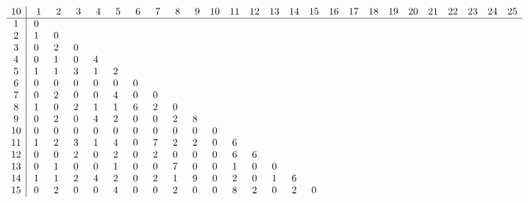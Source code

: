 \begin{landscape}
\[
\begin{array}{c|ccccccccccccccccccccccccc}\addcontentsline{lot}{table}{\protect\numberline{}Dimensions of the Kernel of $\mathcal{L}_{r,c,10}$}
10&  \phantom{0}1&  \phantom{0}2&  \phantom{0}3&  \phantom{0}4&  \phantom{0}5&  \phantom{0}6&  \phantom{0}7&  \phantom{0}8&  \phantom{0}9& 10& 11& 12& 13& 14& 15& 16& 17& 18& 19& 20& 21& 22& 23& 24& 25\\
\hline
 1&  0&   &   &   &   &   &   &   &   &   &   &   &   &   &   &   &   &   &   &   &   &   &   &   &   \\
 2&  1&  0&   &   &   &   &   &   &   &   &   &   &   &   &   &   &   &   &   &   &   &   &   &   &   \\
 3&  0&  2&  0&   &   &   &   &   &   &   &   &   &   &   &   &   &   &   &   &   &   &   &   &   &   \\
 4&  0&  1&  0&  4&   &   &   &   &   &   &   &   &   &   &   &   &   &   &   &   &   &   &   &   &   \\
 5&  1&  1&  3&  1&  2&   &   &   &   &   &   &   &   &   &   &   &   &   &   &   &   &   &   &   &   \\
 6&  0&  0&  0&  0&  0&  0&   &   &   &   &   &   &   &   &   &   &   &   &   &   &   &   &   &   &   \\
 7&  0&  2&  0&  0&  4&  0&  0&   &   &   &   &   &   &   &   &   &   &   &   &   &   &   &   &   &   \\
 8&  1&  0&  2&  1&  1&  6&  2&  0&   &   &   &   &   &   &   &   &   &   &   &   &   &   &   &   &   \\
 9&  0&  2&  0&  4&  2&  0&  0&  2&  8&   &   &   &   &   &   &   &   &   &   &   &   &   &   &   &   \\
10&  0&  0&  0&  0&  0&  0&  0&  0&  0&  0&   &   &   &   &   &   &   &   &   &   &   &   &   &   &   \\
11&  1&  2&  3&  1&  4&  0&  7&  2&  2&  0&  6&   &   &   &   &   &   &   &   &   &   &   &   &   &   \\
12&  0&  0&  2&  0&  2&  0&  2&  0&  0&  0&  6&  6&   &   &   &   &   &   &   &   &   &   &   &   &   \\
13&  0&  1&  0&  0&  1&  0&  0&  7&  0&  0&  1&  0&  0&   &   &   &   &   &   &   &   &   &   &   &   \\
14&  1&  1&  2&  4&  2&  0&  2&  1&  9&  0&  2&  0&  1&  6&   &   &   &   &   &   &   &   &   &   &   \\
15&  0&  2&  0&  0&  4&  0&  0&  2&  0&  0&  8&  2&  0&  2&  0&   &   &   &   &   &   &   &   &   &   \\

\end{array}\]
\end{landscape}
